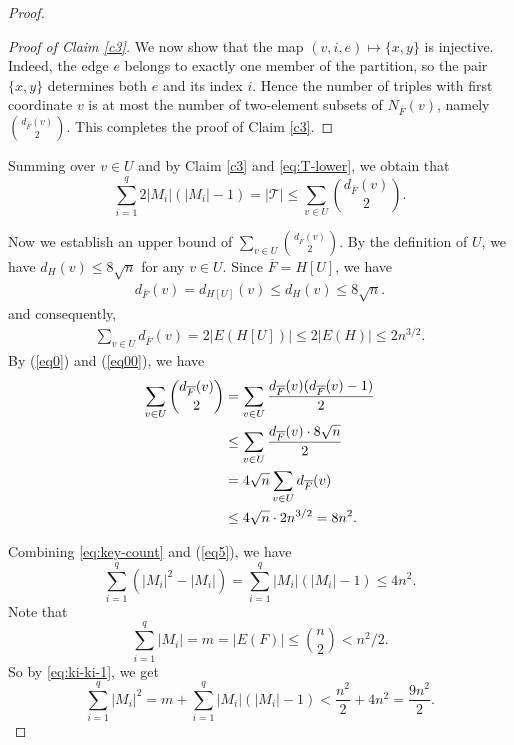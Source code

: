 \documentclass[11pt,a4paper]{article}
\begin{document}
\begin{proof}
\begin{proof}[Proof of Claim \ref{c3}]
We now show that the map $(v,i,e)\mapsto \{x,y\}$ is injective.  
Indeed, the edge $e$ belongs to exactly one member of the partition, so the pair $\{x,y\}$ determines both $e$ and its index $i$.  
Hence the number of triples with first coordinate $v$ is at most the number of two-element subsets of
$N_{\overline F}(v)$, namely $\binom{d_{\overline {F}}(v)}{2}$. This completes the proof of Claim \ref{c3}.  
\end{proof}


Summing over $v\in U$ and by Claim \ref{c3} and \eqref{eq:T-lower}, we obtain that 
\begin{equation}\label{eq:key-count}
\sum_{i=1}^q 2|M_i|(|M_i|-1)=|\mathcal T|
\le \sum_{v\in U}\binom{d_{\overline {F}}(v)}{2}.
\end{equation}

Now we establish an upper bound of $\sum_{v\in U}\binom{d_{\overline {F}}(v)}{2}$.
By the definition of $U$, we have $d_H(v)\le 8\sqrt n$ for any $v\in U$.
 Since $\overline {F}=H[U]$, we have 
 \begin{align}\label{eq0}
 d_{\overline {F}}(v)=d_{H[U]}(v)\le d_H(v)\le 8\sqrt n.
 \end{align}
and consequently,
\begin{align}\label{eq00}
\sum_{v\in U}d_{\overline {F}}(v)=2|E(H[U])|
\le 2|E(H)|\le 2n^{3/2}.
\end{align}
By (\ref{eq0}) and (\ref{eq00}), we have
\begin{align}\label{eq5}
\sum_{v\in U}\binom{d_{\overline {F}}(v)}{2}&=\sum_{v\in U}\frac{d_{\overline {F}}(v)(d_{\overline {F}}(v)-1)}{2}\notag\\
&\le \sum_{v\in U} \frac{d_{\overline {F}}(v)\cdot 8\sqrt n}{2}\notag\\
&= 4\sqrt n\sum_{v\in U}d_{\overline {F}}(v)\notag\\
&\le 4\sqrt n\cdot 2n^{3/2}=8n^2.
\end{align}


Combining \eqref{eq:key-count} and (\ref{eq5}), we have
\begin{equation}\label{eq:ki-ki-1}
\sum_{i=1}^q (|M_i|^2-|M_i|)=\sum_{i=1}^q |M_i|(|M_i|-1)\le 4n^2.
\end{equation}
Note that 
\[
\sum_{i=1}^q |M_i|=m=|E(F)|\le \binom n2<n^2/2.
\]
So by  \eqref{eq:ki-ki-1}, we get
\begin{equation}\label{eq:square-sum}
\sum_{i=1}^q |M_i|^2=m+\sum_{i=1}^q  |M_i|( |M_i|-1)<\frac{n^2}{2}+4n^2=\frac{9n^2}{2}.
\end{equation}




\end{proof}
\end{document}
